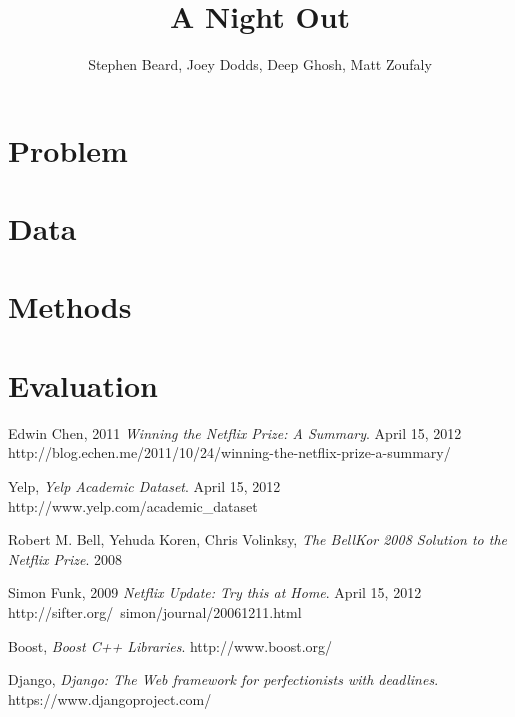 \documentclass[12pt]{article}
\begin{document}

\title{A Night Out}
\author{Stephen Beard, Joey Dodds, Deep Ghosh, Matt Zoufaly}
\maketitle

\section{Problem}

\newcommand{\bestRMSE}{0.9307 }
\newcommand{\bestRMSEnsp}{0.9307}
\newcommand{\bestK}{48 }
\newcommand{\bestNetflixRMSE}{0.8712 }
\newcommand{\bestNetflixRMSEnsp}{0.8712}
\newcommand{\netDiff}{0.06 }

\newcommand{\numBusCA}{707 } 
\newcommand{\numBusOther}{1745 }
\newcommand{\numBusOthernsp}{1745}
\newcommand{\numBusTotal}{2,452 }
\newcommand{\numUserTotal}{1,799 }

\newcommand{\numRatingCA}{8,970 } 
\newcommand{\numRatingOther}{19,340 }
\newcommand{\numRatingTotal}{28,310 }

\newcommand{\posAccuracy}{92.61\% }
\newcommand{\posInaccuracy}{7.39\% }

\section{Data}


\section{Methods}


\section{Evaluation}


\begin{thebibliography}{9}

  Edwin Chen, 2011
  \emph{Winning the Netflix Prize: A Summary}.
  April 15, 2012
  http://blog.echen.me/2011/10/24/winning-the-netflix-prize-a-summary/

  Yelp, 
  \emph{Yelp Academic Dataset}.
  April 15, 2012
  http://www.yelp.com/academic\_dataset 

  Robert M. Bell, Yehuda Koren, Chris Volinksy,
  \emph{The BellKor 2008 Solution to the Netflix Prize}.
  2008

  Simon Funk, 2009
  \emph{Netflix Update: Try this at Home}.
  April 15, 2012
  http://sifter.org/~simon/journal/20061211.html

	Boost,
	\emph{Boost C++ Libraries}.
	http://www.boost.org/


 Django,
 \emph{Django: The Web framework for perfectionists with deadlines}.
 https://www.djangoproject.com/

\end{thebibliography}
\end{document}
